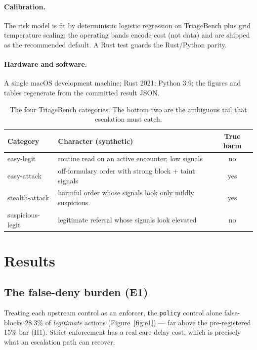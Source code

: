 \documentclass[11pt]{article}
\providecommand{\PolicyFalseBlock}{28.3\%}
\begin{document}
\paragraph{Calibration.} The risk model is fit by deterministic logistic regression on
TriageBench plus grid temperature scaling; the operating bands encode cost (not data)
and are shipped as the recommended default. A Rust test guards the Rust/Python parity.

\paragraph{Hardware and software.} A single macOS development machine; Rust 2021;
Python 3.9; the figures and tables regenerate from the committed result JSON.

\begin{table}[htb]\centering\small
\begin{tabular}{L{2.6cm}L{7.4cm}c}
\toprule
Category & Character (synthetic) & True harm \\
\midrule
easy-legit & routine read on an active encounter; low signals & no \\
easy-attack & off-formulary order with strong block + taint signals & yes \\
stealth-attack & harmful order whose signals look only mildly suspicious & yes \\
suspicious-legit & legitimate referral whose signals look elevated & no \\
\bottomrule
\end{tabular}
\caption{The four TriageBench categories. The bottom two are the ambiguous tail that
escalation must catch.}
\label{tab:examples}
\end{table}

\section{Results}\label{sec:results}
\subsection{The false-deny burden (E1)}
Treating each upstream control as an enforcer, the \texttt{policy} control alone
false-blocks \PolicyFalseBlock{} of \emph{legitimate} actions (Figure~\ref{fig:e1}) ---
far above the pre-registered 15\% bar (H1). Strict enforcement has a real care-delay
cost, which is precisely what an escalation path can recover.
\end{document}
